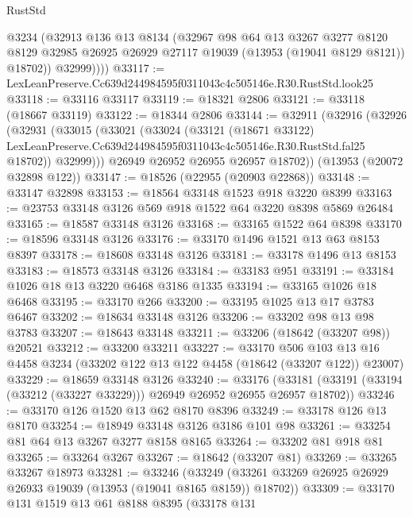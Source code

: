 \begin{lexlean}{RustStd}
\begin{coremodule}
            @3234
            (@32913
              @136
              @13
              @8134
              (@32967
                @98
                @64
                @13
                @3267
                @3277
                @8120
                @8129
                @32985
                @26925
                @26929
                @27117
                @19039
                (@13953 (@19041 @8129 @8121))
                @18702))
            @32999))))
@33117 := LexLeanPreserve.Cc639d244984595f0311043c4c505146e.R30.RustStd.look25
@33118 := @33116 @33117
@33119 := @18321 @2806
@33121 := @33118 (@18667 @33119)
@33122 := @18344 @2806
@33144 := @32911
    (@32916
      (@32926
        (@32931
          (@33015
            (@33021
              (@33024
                (@33121
                  (@18671 @33122)
                  LexLeanPreserve.Cc639d244984595f0311043c4c505146e.R30.RustStd.fal25
                  @18702))
              @32999)))
        @26949
        @26952
        @26955
        @26957
        @18702))
    (@13953 (@20072 @32898 @122))
@33147 := @18526 (@22955 (@20903 @22868))
@33148 := @33147 @32898
@33153 := @18564 @33148 @1523 @918 @3220 @8399
@33163 := @23753 @33148 @3126 @569 @918 @1522 @64 @3220 @8398 @5869 @26484
@33165 := @18587 @33148 @3126
@33168 := @33165 @1522 @64 @8398
@33170 := @18596 @33148 @3126
@33176 := @33170 @1496 @1521 @13 @63 @8153 @8397
@33178 := @18608 @33148 @3126
@33181 := @33178 @1496 @13 @8153
@33183 := @18573 @33148 @3126
@33184 := @33183 @951
@33191 := @33184 @1026 @18 @13 @3220 @6468 @3186 @1335
@33194 := @33165 @1026 @18 @6468
@33195 := @33170 @266
@33200 := @33195 @1025 @13 @17 @3783 @6467
@33202 := @18634 @33148 @3126
@33206 := @33202 @98 @13 @98 @3783
@33207 := @18643 @33148
@33211 := @33206 (@18642 (@33207 @98)) @20521
@33212 := @33200 @33211
@33227 := @33170
    @506
    @103
    @13
    @16
    @4458
    @3234
    (@33202 @122 @13 @122 @4458 (@18642 (@33207 @122)) @23007)
@33229 := @18659 @33148 @3126
@33240 := @33176
    (@33181 (@33191 (@33194 (@33212 (@33227 @33229))) @26949 @26952 @26955 @26957 @18702))
@33246 := @33170 @126 @1520 @13 @62 @8170 @8396
@33249 := @33178 @126 @13 @8170
@33254 := @18949 @33148 @3126 @3186 @101 @98
@33261 := @33254 @81 @64 @13 @3267 @3277 @8158 @8165
@33264 := @33202 @81 @918 @81
@33265 := @33264 @3267
@33267 := @18642 (@33207 @81)
@33269 := @33265 @33267 @18973
@33281 := @33246
    (@33249 (@33261 @33269 @26925 @26929 @26933 @19039 (@13953 (@19041 @8165 @8159)) @18702))
@33309 := @33170
    @131
    @1519
    @13
    @61
    @8188
    @8395
    (@33178
      @131

\end{coremodule}
\end{lexlean}
